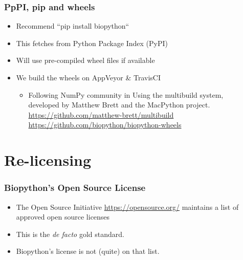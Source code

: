 \begin{frame}
\frametitle{PpPI, pip and wheels}
\begin{itemize}
\item Recommend ``pip install biopython``
\item This fetches from Python Package Index (PyPI)
\item Will use pre-compiled wheel files if available
\item We build the wheels on AppVeyor \& TravisCI
    \begin{itemize}
        \item Following NumPy community in Using the multibuild system, \\
              developed by Matthew Brett and the MacPython project. \\
              \url{https://github.com/matthew-brett/multibuild} \\
              \url{https://github.com/biopython/biopython-wheels}
    \end{itemize}
\end{itemize}
\end{frame}

\section{Re-licensing}

\begin{frame}
\frametitle{Biopython's Open Source License}
\begin{itemize}
\item The Open Source Initiative \url{https://opensource.org/}
    maintains a list of approved open source licenses
\item This is the \textit{de facto} gold standard.
\item Biopython's license is not (quite) on that list.
\end{itemize}
\end{frame}

